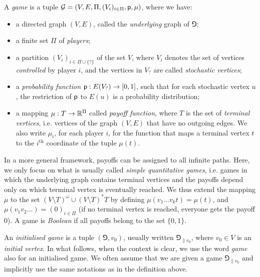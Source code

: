 \begin{definition}[Game]
    A \emph{game} is a tuple $\mathcal{G} = (V, E, \Pi, (V_i)_{i \in \Pi}, \mathsf{p}, \mu)$, where we have:
    \begin{itemize}
        \item a directed graph $(V, E)$, called the \emph{underlying} graph of $\Game$;

        \item a finite set $\Pi$ of \emph{players};

        \item a partition $(V_i)_{i \in \Pi \cup \{?\}}$ of the set $V$, where $V_i$ denotes the set of vertices \emph{controlled} by player $i$, and the vertices in $V_?$ are called \emph{stochastic vertices};

        \item a \emph{probability function} $\mathsf{p}: E(V_?) \to [0, 1]$, such that for each stochastic vertex $u$, the restriction of $\mathsf{p}$ to $E(u)$ is a probability distribution;

        \item a mapping $\mu: T \to \mathbb{R}^\Pi$ called \emph{payoff function}, where $T$ is the set of \emph{terminal vertices}, i.e. vertices of the graph $(V, E)$ that have no outgoing edges.
        We also write $\mu_i$, for each player $i$, for the function that maps a terminal vertex $t$ to the $i^\text{th}$ coordinate of the tuple $\mu(t)$.
    \end{itemize}
\end{definition}

In a more general framework, payoffs can be assigned to all infinite paths.
Here, we only focus on what is usually called \emph{simple quantitative games}, i.e. games in which the underlying graph contains terminal vertices and the payoffs depend only on which terminal vertex is eventually reached.
We thus extend the mapping $\mu$ to the set $(V \setminus T)^\omega \cup (V \setminus T)^* T$ by defining $\mu(v_1 \dots v_k t) = \mu(t)$, and $\mu(v_1 v_2 \dots) = (0)_{i \in \Pi}$ (if no terminal vertex is reached, everyone gets the payoff $0$).
A game is \emph{Boolean} if all payoffs belong to the set $\{0, 1\}$.

An \emph{initialised game} is a tuple $(\Game, v_0)$, usually written $\Game_{\|v_0}$, where $v_0 \in V$ is an \emph{initial vertex}.
In what follows, when the context is clear, we use the word \emph{game} also for an initialised game.
We often assume that we are given a game $\Game_{\|v_0}$ and implicitly use the same notations as in the definition above.

